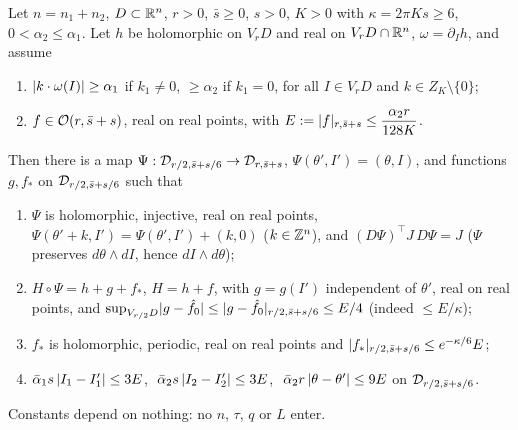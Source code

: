 \begin{proposition}\label{bpP:p2:nfb}
Let $n=n_1+n_2$, $D\subset\mathbb{R}^n$, $r>0$, $\bar s\ge0$, $s>0$, $K>0$ with $\kappa=2\pi Ks\ge6$, $0<\alpha_2\le\alpha_1$. Let $h$ be holomorphic on $V_rD$ and real on $V_rD\cap\mathbb{R}^n$, $\omega=\partial_Ih$, and assume
\begin{enumerate}[label=(\textup{A}\arabic*)]
\item\label{bpP:p2:a1} $\lvert k\cdot\omega(I)\rvert\ge\alpha_1$ if $k_1\ne0$, $\ge\alpha_2$ if $k_1=0$, for all $I\in V_rD$ and $k\in Z_K\setminus\{0\}$;
\item\label{bpP:p2:a2} $f\in\mathcal O(r,\bar s+s)$, real on real points, with $E:=\lvert f\rvert_{r,\bar s+s}\le\dfrac{\alpha_2r}{128K}$.
\end{enumerate}
Then there is a map $\Psi:\mathcal D_{r/2,\bar s+s/6}\to\mathcal D_{r,\bar s+s}$, $\Psi(\theta',I')=(\theta,I)$, and functions $g,f_*$ on $\mathcal D_{r/2,\bar s+s/6}$ such that
\begin{enumerate}[label=(\alph*)]
\item $\Psi$ is holomorphic, injective, real on real points, $\Psi(\theta'+k,I')=\Psi(\theta',I')+(k,0)$ ($k\in\mathbb{Z}^n$), and $(D\Psi)^\top J\,D\Psi=J$ ($\Psi$ preserves $d\theta\wedge dI$, hence $dI\wedge d\theta$);
\item $H\circ\Psi=h+g+f_*$, $H=h+f$, with $g=g(I')$ independent of $\theta'$, real on real points, and $\sup_{V_{r/2}D}\lvert g-\hat f_0\rvert\le\lvert g-\hat f_0\rvert_{r/2,\bar s+s/6}\le E/4$ (indeed $\le E/\kappa$);
\item $f_*$ is holomorphic, periodic, real on real points and $\lvert f_*\rvert_{r/2,\bar s+s/6}\le e^{-\kappa/6}E$;
\item $\bar\alpha_1s\,\lvert I_1-I_1'\rvert\le3E$, $\ \bar\alpha_2s\,\lvert I_2-I_2'\rvert\le3E$, $\ \bar\alpha_2r\,\lvert \theta-\theta'\rvert\le9E$ on $\mathcal D_{r/2,\bar s+s/6}$.
\end{enumerate}
Constants depend on nothing: no $n$, $\tau$, $q$ or $L$ enter.
\end{proposition}
